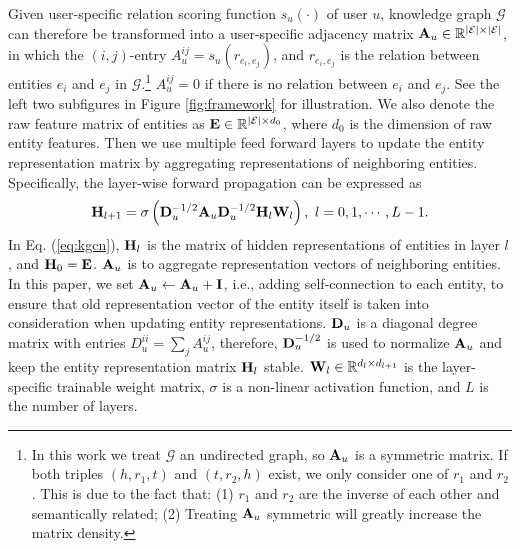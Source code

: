 \documentclass[sigconf]{acmart}
\begin{document}
		Given user-specific relation scoring function $s_u(\cdot)$ of user $u$, knowledge graph $\mathcal G$ can therefore be transformed into a user-specific adjacency matrix ${\bf A}_u \in \mathbb R^{|\mathcal E| \times |\mathcal E|}$, in which the $(i, j)$-entry $A_u^{ij} = s_u(r_{e_i, e_j})$, and $r_{e_i, e_j}$ is the relation between entities $e_i$ and $e_j$ in $\mathcal G$.\footnote{In this work we treat $\mathcal G$ an undirected graph, so ${\bf A}_u$ is a symmetric matrix. If both triples $(h, r_1, t)$ and $(t, r_2, h)$ exist, we only consider one of $r_1$ and $r_2$. This is due to the fact that: (1) $r_1$ and $r_2$ are the inverse of each other and semantically related; (2) Treating ${\bf A}_u$ symmetric will greatly increase the matrix density.}
		$A_u^{ij}=0$ if there is no relation between $e_i$ and $e_j$.
		See the left two subfigures in Figure \ref{fig:framework} for illustration.
		We also denote the raw feature matrix of entities as ${\bf E} \in \mathbb R^{|\mathcal E| \times d_0}$, where $d_0$ is the dimension of raw entity features.
		Then we use multiple feed forward layers to update the entity representation matrix by aggregating representations of neighboring entities.
		Specifically, the layer-wise forward propagation can be expressed as
		\begin{equation}
		\label{eq:kgcn}
			{\bf H}_{l+1} = \sigma \left({\bf D}_u^{-1/2} {\bf A}_u {\bf D}_u^{-1/2} {\bf H}_l {\bf W}_l \right), \ l = 0, 1, \cdots, L-1.
		\end{equation}
		In Eq. (\ref{eq:kgcn}), ${\bf H}_l$ is the matrix of hidden representations of entities in layer $l$, and ${\bf H}_0 = {\bf E}$.
		${\bf A}_u$ is to aggregate representation vectors of neighboring entities.
		In this paper, we set ${\bf A}_u \leftarrow {\bf A}_u + \bf{I}$, i.e., adding self-connection to each entity, to ensure that old representation vector of the entity itself is taken into consideration when updating entity representations.
		${\bf D}_u$ is a diagonal degree matrix with entries $D_u^{ii} = \sum_j A_{u}^{ij}$, therefore, ${\bf D}_u^{-1/2}$ is used to normalize ${\bf A}_u$ and keep the entity representation matrix ${\bf H}_l$ stable.
		 ${\bf W}_l \in \mathbb R^{d_l \times d_{l+1}}$ is the layer-specific trainable weight matrix, $\sigma$ is a non-linear activation function, and $L$ is the number of layers.
		 
\end{document}
